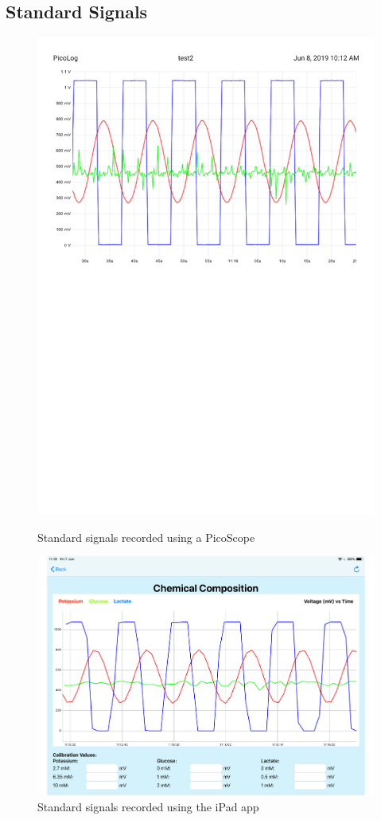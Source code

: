 \subsection{Standard Signals}

\begin{figure}[h!]
\centering
\includegraphics[trim={0cm 0cm 0cm  0cm}, clip, width=.75\textwidth]{./figures/standardsignals/picologChemComp.pdf}
\captionsetup{justification=centering}
\caption{Standard signals recorded using a PicoScope}
\label{fig: test1 picolog}
\bigbreak
\includegraphics[trim={0cm 0cm 0cm  0cm}, clip, width=.75\textwidth]{./figures/standardsignals/appChemComp.pdf}
\captionsetup{justification=centering}
\caption{Standard signals recorded using the iPad app}
\label{fig: test1 app}
\end{figure}



